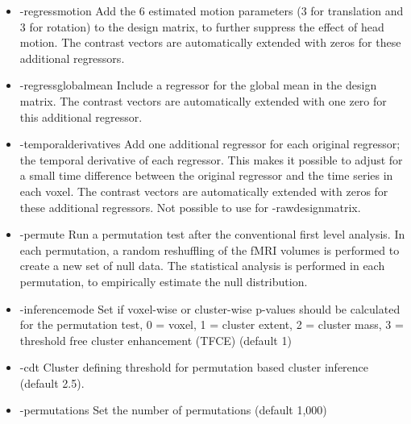 \begin{itemize}
\item -regressmotion 
\newline \newline Add the 6 estimated motion parameters (3 for translation and 3 for rotation) to the design matrix, to further suppress the effect of head motion. The contrast vectors are automatically extended with zeros for these additional regressors. 

\item -regressglobalmean 
\newline \newline Include a regressor for the global mean in the design matrix. The contrast vectors are automatically extended with one zero for this additional regressor. 
 
\item -temporalderivatives 
\newline \newline Add one additional regressor for each original regressor; the temporal derivative of each regressor. This makes it possible to adjust for a small time difference between the original regressor and the time series in each voxel. The contrast vectors are automatically extended with zeros for these additional regressors. Not possible to use for -rawdesignmatrix.

\item -permute
\newline \newline Run a permutation test after the conventional first level analysis. In each permutation, a random reshuffling of the fMRI volumes is performed to create a new set of null data. The statistical analysis is performed in each permutation, to empirically estimate the null distribution. 

\item -inferencemode 
\newline \newline Set if voxel-wise or cluster-wise p-values should be calculated for the permutation test, 0 = voxel, 1 = cluster extent, 2 = cluster mass, 3 = threshold free cluster enhancement (TFCE) (default 1)

\item -cdt 
\newline \newline Cluster defining threshold for permutation based cluster inference (default 2.5). 

\item -permutations 
\newline \newline Set the number of permutations (default 1,000)


\end{itemize}
